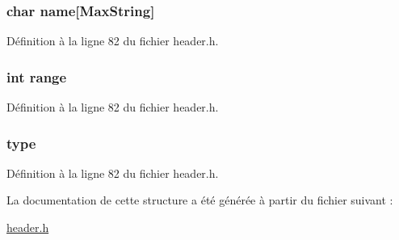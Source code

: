 \hypertarget{structt__skill_ab27f28c5ead39031421706ddbbd1edea}{
\subsubsection[{name}]{\setlength{\rightskip}{0pt plus 5cm}char name\mbox{[}{\bf Max\+String}\mbox{]}}}\label{structt__skill_ab27f28c5ead39031421706ddbbd1edea}


Définition à la ligne 82 du fichier header.\+h.

\hypertarget{structt__skill_a037e8e370380046bec287bdc96942091}{
\subsubsection[{range}]{\setlength{\rightskip}{0pt plus 5cm}int range}}\label{structt__skill_a037e8e370380046bec287bdc96942091}


Définition à la ligne 82 du fichier header.\+h.

\hypertarget{structt__skill_ac00edc3c188c78c47878a357ecff2954}{
\subsubsection[{type}]{ type}}\label{structt__skill_ac00edc3c188c78c47878a357ecff2954}


Définition à la ligne 82 du fichier header.\+h.



La documentation de cette structure a été générée à partir du fichier suivant \+:\begin{DoxyCompactItemize}
\item 
\hyperlink{header_8h}{header.\+h}\end{DoxyCompactItemize}
